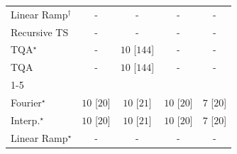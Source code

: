 \begin{tabular}{l|cccc|}
Linear Ramp$^\dagger$ & {\cellcolor[HTML]{000000}} \color[HTML]{F1F1F1} {\cellcolor{white}} \color{black} - & {\cellcolor[HTML]{000000}} \color[HTML]{F1F1F1} {\cellcolor{white}} \color{black} - & {\cellcolor[HTML]{000000}} \color[HTML]{F1F1F1} {\cellcolor{white}} \color{black} - & {\cellcolor[HTML]{000000}} \color[HTML]{F1F1F1} {\cellcolor{white}} \color{black} - \\
Recursive TS & {\cellcolor[HTML]{000000}} \color[HTML]{F1F1F1} {\cellcolor{white}} \color{black} - & {\cellcolor[HTML]{000000}} \color[HTML]{F1F1F1} {\cellcolor{white}} \color{black} - & {\cellcolor[HTML]{000000}} \color[HTML]{F1F1F1} {\cellcolor{white}} \color{black} - & {\cellcolor[HTML]{000000}} \color[HTML]{F1F1F1} {\cellcolor{white}} \color{black} - \\
TQA$^\star$ & {\cellcolor[HTML]{000000}} \color[HTML]{F1F1F1} {\cellcolor{white}} \color{black} - & {\cellcolor[HTML]{00441B}} \color[HTML]{F1F1F1} $10$ [$144$] & {\cellcolor[HTML]{000000}} \color[HTML]{F1F1F1} {\cellcolor{white}} \color{black} - & {\cellcolor[HTML]{000000}} \color[HTML]{F1F1F1} {\cellcolor{white}} \color{black} - \\
TQA & {\cellcolor[HTML]{000000}} \color[HTML]{F1F1F1} {\cellcolor{white}} \color{black} - & {\cellcolor[HTML]{00441B}} \color[HTML]{F1F1F1} $10$ [$144$] & {\cellcolor[HTML]{000000}} \color[HTML]{F1F1F1} {\cellcolor{white}} \color{black} - & {\cellcolor[HTML]{000000}} \color[HTML]{F1F1F1} {\cellcolor{white}} \color{black} - \\
\cline{1-5}
\multicolumn{5}{c}{\rule{0pt}{8pt}SV} \\
\midrule
Fourier$^\star$ & {\cellcolor[HTML]{00441B}} \color[HTML]{F1F1F1} $10$ [$20$] & {\cellcolor[HTML]{00441B}} \color[HTML]{F1F1F1} $10$ [$21$] & {\cellcolor[HTML]{00441B}} \color[HTML]{F1F1F1} $10$ [$20$] & {\cellcolor[HTML]{37A055}} \color[HTML]{F1F1F1} $7$ [$20$] \\
Interp.$^\star$ & {\cellcolor[HTML]{00441B}} \color[HTML]{F1F1F1} $10$ [$20$] & {\cellcolor[HTML]{00441B}} \color[HTML]{F1F1F1} $10$ [$21$] & {\cellcolor[HTML]{00441B}} \color[HTML]{F1F1F1} $10$ [$20$] & {\cellcolor[HTML]{37A055}} \color[HTML]{F1F1F1} $7$ [$20$] \\
Linear Ramp$^\star$ & {\cellcolor[HTML]{000000}} \color[HTML]{F1F1F1} {\cellcolor{white}} \color{black} - & {\cellcolor[HTML]{000000}} \color[HTML]{F1F1F1} {\cellcolor{white}} \color{black} - & {\cellcolor[HTML]{000000}} \color[HTML]{F1F1F1} {\cellcolor{white}} \color{black} - & {\cellcolor[HTML]{000000}} \color[HTML]{F1F1F1} {\cellcolor{white}} \color{black} - \\

\end{tabular}
